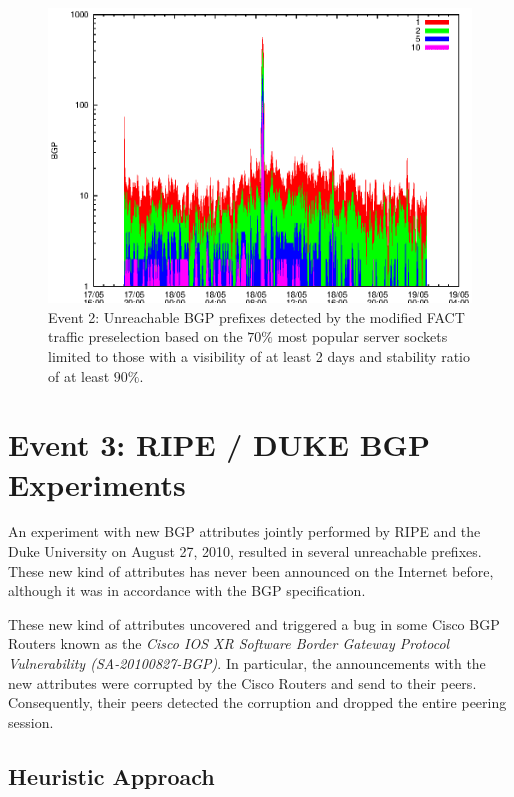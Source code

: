 \begin{figure}
	[p] \centering 
	\includegraphics[width=0.75\linewidth]{images/events/2010_05_18/bgp_log_Set_var_0_1_stab_9_vts_2.eps}
	\caption{Event 2: Unreachable BGP prefixes detected by the modified FACT traffic preselection based on the $70\%$ most popular server sockets limited to those with a visibility of at least 2 days and stability ratio of at least $90\%$.} 
	\label{fig:TIER1_FACT_popularVTS2STAB9} 
\end{figure}

\newpage
\section{Event 3: RIPE / DUKE BGP Experiments}

An experiment with new BGP attributes jointly performed by RIPE and the Duke 
University on August 27, 2010, resulted in several unreachable prefixes\citep{SchatzmannPAM2011}. These 
new kind of attributes has never been announced on the Internet before,  
although it was in accordance with the BGP specification\citep{ripe_duke}.

These new kind of attributes uncovered and triggered a bug in some Cisco BGP 
Routers known as the \emph{Cisco IOS XR Software Border Gateway Protocol Vulnerability (SA-20100827-BGP)}\citep{cisco_vulnerability}. In particular, the announcements with the new attributes were corrupted 
by the Cisco Routers and send to their peers. Consequently, their peers detected 
the corruption and dropped the entire peering session\citep{ripe_duke}.

\subsection{Heuristic Approach}

